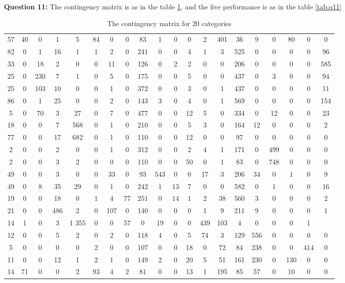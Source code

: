 \documentclass[runningheads]{llncs}
\begin{document}
\textbf{Question 11:}
The contingency matrix is as in the table \ref{tab:q11m}, and the five performance is as in the table \ref{tab:q11}
\begin{table}[h]
\center
\caption{The contingency matrix for 20 categories}
\begin{tabular}{c c c c c c c c c c c c c c c c c c c c}
 57 & 40 & 0 & 1 & 5 & 84 & 0 & 0 & 83 & 1 & 0 & 0 & 2 & 401 & 36 & 9 & 0 & 80 & 0 & 0  \\ 
 82 & 0 & 1 & 16 & 1 & 1 & 2 & 0 & 241 & 0 & 0 & 4 & 1 & 3 & 525 & 0 & 0 & 0 & 0 & 96  \\
 33 & 0 & 18 & 2 & 0 & 0 & 11 & 0 & 126 & 0 & 2 & 2 & 0 & 0 & 206 & 0 & 0 & 0 & 0 & 585  \\
 25 & 0 & 230 & 7 & 1 & 0 & 5 & 0 & 175 &  0 & 0 & 5 & 0 & 0 & 437 & 0 & 3 & 0 & 0 & 94  \\
 25 & 0 & 103 & 10 & 0 & 0 & 1 & 0 & 372 & 0 & 0 & 3 & 0 & 1 & 437 &  0  & 0 &  0 & 0 & 11  \\
 86 &  0 &  1 & 25 &  0 &  0 &  2 &  0& 143 &  3 &  0 &  4 &  0 &  1 &569 &  0 &  0 &  0 & 0 &154  \\
 5 &  0 & 70 &  3 & 27 &  0 &  7  & 0& 477  & 0 &  0  &12  & 5 &  0 &334 &  0 & 12 &  0 & 0  &23  \\
 18 &  0 &  0  & 7 &568 &  0 &  1 &  0 &210 &  0 &  0 &  5 &  3 &  0 &164 & 12 &  0 &  0 & 0 &  2  \\
 77 &  0 &  0 & 17& 682 &  0 &  1 &  0& 110 &  0 &  0 & 12 &  0 &  0 & 97 &  0  & 0  & 0 & 0 &  0  \\
 2  & 0 &  0 &  2 &  0 &  0  & 1  & 0 &312 &  0 &  0   &2  & 4 &  1& 171 &  0 &499 &  0&  0 &  0  \\
 2  & 0&   0 &  3  & 2 &  0  & 0  & 0& 110 &  0  & 0  &50  & 0  & 1  &83  & 0 &748  & 0 & 0  & 0  \\
 49 &  0 &  0 &  3 &  0 &  0 & 33 &  0 & 93 &543 &  0 &  0&  17   &3 &206 & 34 &  0 &  1 & 0 &  9  \\
 49  & 0&   8 & 35  &29  & 0 &  1  & 0 &242 &  1 & 13  & 7 &  0  & 0 &582 &  0 &  1  & 0 & 0 & 16  \\
 19   &0 &  0 & 18  & 0  & 1  & 4  &77 &251&   0 & 14 &  1 &  2 & 38 &560 &  3 &  0 &  0 & 0 &  2  \\
 21  & 0 &  0 &486  & 2   &0 &107  & 0& 140  & 0  & 0  & 0  & 1  & 9 &211  & 9  & 0  & 0 & 0  & 1  \\
 14  & 1 &  0  & 3  & 1 355 &  0 &  0 & 57  & 0 & 19 &  0 &  0 &439 &103 &  4 &  0 &  0 & 0 &  1  \\
 12  & 0  & 0 &  5  & 2  & 0  & 2 &  0& 118  & 4 &  0  & 5&  74&   3& 129 &556&   0  & 0&  0  & 0  \\
 5  & 0 &  0 &  0 &  0 &  2 &  0 &  0& 107 &  0  & 0 & 18  & 0 & 72 & 84 &238 &  0 &  0&  414 &  0  \\
 11 &  0 &  0&  12 &  1 &  2 &  1 &  0 &149  & 2 &  0 & 20 &  5 & 51& 161& 230 &  0& 130 & 0  & 0  \\
 14 & 71 &  0 &  0  & 2 & 93 &  4 &  2 & 81 &  0 &  0 & 13  & 1& 195&  85&  57 &  0 & 10 & 0  & 0  \\
\end{tabular}
\label{tab:q11m}
\end{table}
\end{document}
